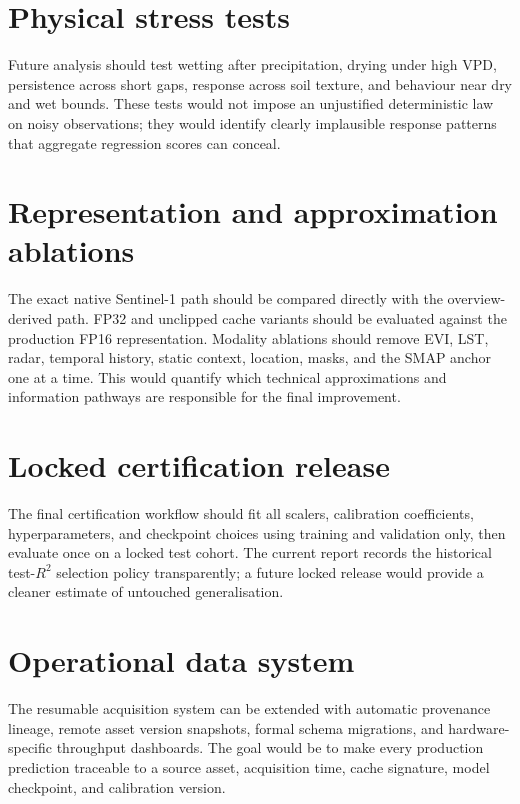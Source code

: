 \documentclass[12pt,a4paper]{report}
\begin{document}
\section{Physical stress tests}
Future analysis should test wetting after precipitation, drying under high VPD,
persistence across short gaps, response across soil texture, and behaviour near
dry and wet bounds. These tests would not impose an unjustified deterministic
law on noisy observations; they would identify clearly implausible response
patterns that aggregate regression scores can conceal.

\section{Representation and approximation ablations}
The exact native Sentinel-1 path should be compared directly with the
overview-derived path. FP32 and unclipped cache variants should be evaluated
against the production FP16 representation. Modality ablations should remove
EVI, LST, radar, temporal history, static context, location, masks, and the
SMAP anchor one at a time. This would quantify which technical approximations
and information pathways are responsible for the final improvement.

\section{Locked certification release}
The final certification workflow should fit all scalers, calibration
coefficients, hyperparameters, and checkpoint choices using training and
validation only, then evaluate once on a locked test cohort. The current report
records the historical test-$R^2$ selection policy transparently; a future
locked release would provide a cleaner estimate of untouched generalisation.

\section{Operational data system}
The resumable acquisition system can be extended with automatic provenance
lineage, remote asset version snapshots, formal schema migrations, and
hardware-specific throughput dashboards. The goal would be to make every
production prediction traceable to a source asset, acquisition time, cache
signature, model checkpoint, and calibration version.

\clearpage
\renewcommand{\bibname}{References}
\nocite{*}


\end{document}
